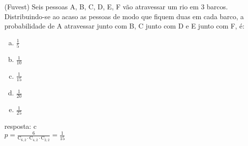 \begin{ex}
 (Fuvest) Seis pessoas A, B, C, D, E, F vão atravessar um rio em 3 barcos. Distribuindo-se ao acaso as pessoas de modo que fiquem duas em cada barco, a probabilidade de A atravessar junto com B, C junto com D e E junto com F, é:
    \begin{enumerate}[(a)]
    \item $\frac{1}{5}$
    \item $\frac{1}{10}$
    \item $\frac{1}{15}$
    \item $\frac{1}{20}$
    \item $\frac{1}{25}$
    \end{enumerate}
      \begin{sol}
        resposta: c \\
        $p=\frac{6}{
        \mathrm{C}_{6,2}\cdot\mathrm{C}_{4,2}\cdot\mathrm{C}_{2,2}}=\frac{1}{15}$
      \end{sol}
\end{ex}